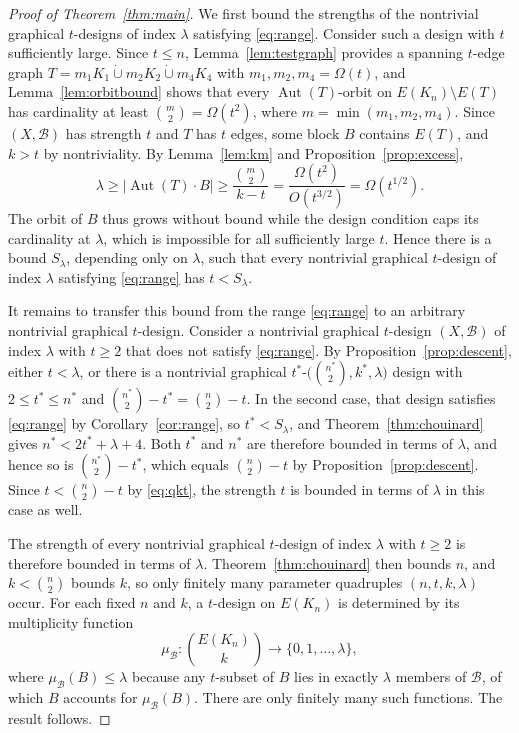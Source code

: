 \documentclass[12pt]{amsart}
\theoremstyle{definition}
\DeclareMathOperator{\Aut}{Aut}
\newcommand{\dcup}{\mathbin{\dot\cup}}
\newcommand{\cB}{\mathcal{B}}
\begin{document}
\begin{proof}[Proof of Theorem~\ref{thm:main}]
We first bound the strengths of the nontrivial graphical $t$-designs of
index $\lambda$ satisfying \eqref{eq:range}. Consider such a design with $t$
sufficiently large. Since $t \leq n$, Lemma~\ref{lem:testgraph} provides a
spanning $t$-edge graph $T = m_1 K_1 \dcup m_2 K_2 \dcup m_4 K_4$ with $m_1,
m_2, m_4 = \Omega(t)$, and Lemma~\ref{lem:orbitbound} shows that every
$\Aut(T)$-orbit on $E(K_n) \setminus E(T)$ has cardinality at least
$\binom{m}{2} = \Omega(t^2)$, where $m = \min(m_1, m_2, m_4)$. Since $(X,
\cB)$ has strength $t$ and $T$ has $t$ edges, some block $B$ contains
$E(T)$, and $k > t$ by nontriviality. By Lemma~\ref{lem:km} and
Proposition~\ref{prop:excess},
\[
\lambda \geq |\Aut(T) \cdot B| \geq \frac{\binom{m}{2}}{k - t}
= \frac{\Omega(t^2)}{O(t^{3/2})} = \Omega(t^{1/2}).
\]
The orbit of $B$ thus grows without bound while the design condition caps
its cardinality at $\lambda$, which is impossible for all sufficiently large
$t$. Hence there is a bound $S_\lambda$, depending only on $\lambda$, such
that every nontrivial graphical $t$-design of index $\lambda$ satisfying
\eqref{eq:range} has $t < S_\lambda$.

It remains to transfer this bound from the range \eqref{eq:range} to an
arbitrary nontrivial graphical $t$-design. Consider a nontrivial graphical
$t$-design $(X, \cB)$ of index $\lambda$ with $t \geq 2$ that does not
satisfy \eqref{eq:range}. By Proposition~\ref{prop:descent}, either $t <
\lambda$, or there is a nontrivial graphical $t^*$-$\bigl(\binom{n^*}{2},
k^*, \lambda\bigr)$ design with $2 \leq t^* \leq n^*$ and $\binom{n^*}{2} -
t^* = \binom{n}{2} - t$. In the second case, that design satisfies
\eqref{eq:range} by Corollary~\ref{cor:range}, so $t^* < S_\lambda$, and
Theorem~\ref{thm:chouinard} gives $n^* < 2t^* + \lambda + 4$. Both $t^*$ and
$n^*$ are therefore bounded in terms of $\lambda$, and hence so is
$\binom{n^*}{2} - t^*$, which equals $\binom{n}{2} - t$ by
Proposition~\ref{prop:descent}. Since $t < \binom{n}{2} - t$ by
\eqref{eq:qkt}, the strength $t$ is bounded in terms of $\lambda$ in this
case as well.

The strength of every nontrivial graphical $t$-design of index $\lambda$
with $t \geq 2$ is therefore bounded in terms of $\lambda$.
Theorem~\ref{thm:chouinard} then bounds $n$, and $k < \binom{n}{2}$ bounds
$k$, so only finitely many parameter quadruples $(n, t, k, \lambda)$ occur.
For each fixed $n$ and $k$, a $t$-design on $E(K_n)$ is determined by its
multiplicity function
\[
\mu_{\cB} : \binom{E(K_n)}{k} \longrightarrow \{0, 1, \ldots, \lambda\},
\]
where $\mu_{\cB}(B) \leq \lambda$ because any $t$-subset of $B$ lies in
exactly $\lambda$ members of $\cB$, of which $B$ accounts for
$\mu_{\cB}(B)$. There are only finitely many such functions. The result
follows.
\end{proof}
\end{document}
